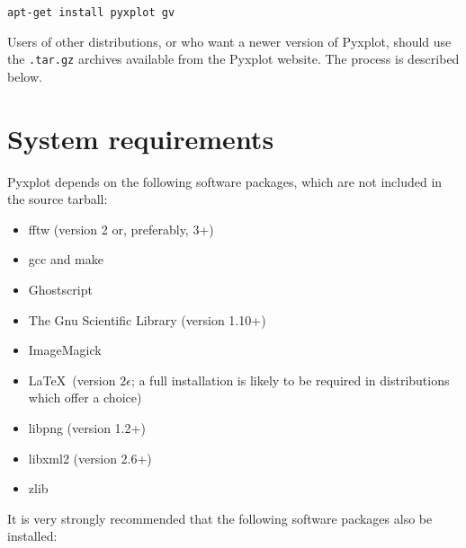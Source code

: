 \begin{verbatim}
apt-get install pyxplot gv
\end{verbatim}

Users of other distributions, or who want a newer version of Pyxplot, should
use the {\tt .tar.gz} archives available from the Pyxplot website. The process
is described below.

\section{System requirements}

Pyxplot depends on the following software packages, which are not included in
the source tarball:

\vspace{0.5cm}
\begin{itemize}
\item fftw (version 2 or, preferably, 3+) 
\item gcc and make
\item Ghostscript 
\item The Gnu Scientific Library (version 1.10+) 
\item ImageMagick 
\item \LaTeX\ (version $2\epsilon$; a full installation is likely to be required in distributions which offer a choice) 
\item libpng (version 1.2+) 
\item libxml2 (version 2.6+) 
\item zlib 
\end{itemize}
\vspace{0.5cm}

\noindent It is very strongly recommended that the following software packages
also be installed:

